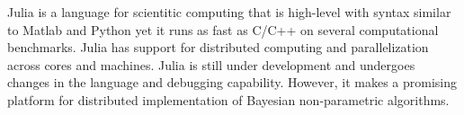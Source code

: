 Julia is a language for scientitic computing that is high-level with syntax similar to Matlab and Python yet it runs as fast as C/C++ on several computational benchmarks. Julia has support for distributed computing and parallelization across cores and machines. Julia is still under development and undergoes changes in the language and debugging capability. However, it makes a promising platform for distributed implementation of Bayesian non-parametric algorithms.
